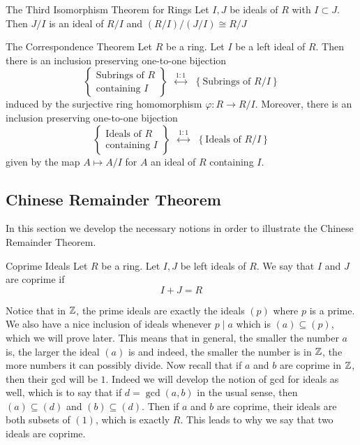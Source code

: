 \documentclass[a4paper]{article}
\begin{document}
\begin{thm}{The Third Isomorphism Theorem for Rings}{} Let $I,J$ be ideals of $R$ with $I\subset J$. Then $J/I$ is an ideal of $R/I$ and $(R/I)/(J/I)\cong R/J$
\end{thm}

\begin{thm}{The Correspondence Theorem}{} Let $R$ be a ring. Let $I$ be a left ideal of $R$. Then there is an inclusion preserving one-to-one bijection $$\left\{\substack{\text{Subrings of }R\\\text{containing }I}\right\}\;\;\overset{1:1}{\longleftrightarrow}\;\;\left\{\text{Subrings of }R/I\right\}$$ induced by the surjective ring homomorphism $\varphi:R\to R/I$. Moreover, there is an inclusion preserving one-to-one bijection $$\left\{\substack{\text{Ideals of }R\\\text{containing }I}\right\}\;\;\overset{1:1}{\longleftrightarrow}\;\;\left\{\text{Ideals of }R/I\right\}$$ given by the map $A\mapsto A/I$ for $A$ an ideal of $R$ containing $I$. 
\end{thm}

\subsection{Chinese Remainder Theorem}
In this section we develop the necessary notions in order to illustrate the Chinese Remainder Theorem. 

\begin{defn}{Coprime Ideals}{} Let $R$ be a ring. Let $I,J$ be left ideals of $R$. We say that $I$ and $J$ are coprime if $$I+J=R$$
\end{defn}

Notice that in $\mathbb{Z}$, the prime ideals are exactly the ideals $(p)$ where $p$ is a prime. We also have a nice inclusion of ideals whenever $p\;|\;a$ which is $(a)\subseteq(p)$, which we will prove later. This means that in general, the smaller the number $a$ is, the larger the ideal $(a)$ is and indeed, the smaller the number is in $\mathbb{Z}$, the more numbers it can possibly divide. Now recall that if $a$ and $b$ are coprime in $\mathbb{Z}$, then their gcd will be $1$. Indeed we will develop the notion of gcd for ideals as well, which is to say that if $d=\gcd(a,b)$ in the usual sense, then $(a)\subseteq(d)$ and $(b)\subseteq(d)$. Then if $a$ and $b$ are coprime, their ideals are both subsets of $(1)$, which is exactly $R$. This leads to why we say that two ideals are coprime. 
\end{document}
